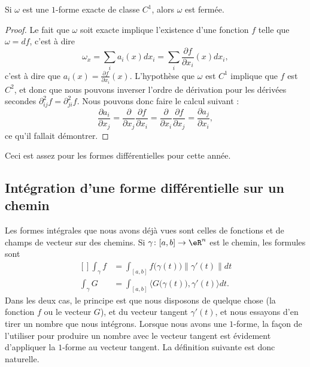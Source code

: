\begin{proposition}
	Si $\omega$ est une $1$-forme exacte de classe $C^1$, alors $\omega$ est fermée.
\end{proposition}

\begin{proof}
	Le fait que $\omega$ soit exacte implique l'existence d'une fonction $f$ telle que $\omega=df$, c'est à dire
	\begin{equation}
		\omega_x=\sum_i a_i(x)dx_i=\sum_i\frac{ \partial f }{ \partial x_i }(x)dx_i,
	\end{equation}
	c'est à dire que $a_i(x)=\frac{ \partial f }{ \partial x_i }(x)$. L'hypothèse que $\omega$ est $C^1$ implique que $f$ est $C^2$, et donc que nous pouvons inverser l'ordre de dérivation pour les dérivées secondes $\partial^2_{ij}f=\partial^2_{ji}f$. Nous pouvons donc faire le calcul suivant :
	\begin{equation}
		\frac{ \partial a_i }{ \partial x_j }=\frac{ \partial  }{ \partial x_j }\frac{ \partial f }{ \partial x_i }=\frac{ \partial  }{ \partial x_i }\frac{ \partial f }{ \partial x_j }=\frac{ \partial a_j }{ \partial x_i },
	\end{equation}
	ce qu'il fallait démontrer.
\end{proof}

Ceci est assez pour les formes différentielles pour cette année.

\subsection{Intégration d'une forme différentielle sur un chemin}

Les formes intégrales que nous avons déjà vues sont celles de fonctions et de champs de vecteur sur des chemins. Si $\gamma\colon [a,b]\to \eR^n$ est le chemin, les formules sont
\begin{equation}
	\begin{aligned}[]
		\int_{\gamma}f&=\int_{[a,b]}f\big( \gamma(t) \big)\| \gamma'(t) \|dt\\
		\int_{\gamma}G&=\int_{[a,b]}\langle G\big( \gamma(t) \big), \gamma'(t)\rangle dt.
	\end{aligned}
\end{equation}
Dans les deux cas, le principe est que nous disposons de quelque chose (la fonction $f$ ou le vecteur $G$), et du vecteur tangent $\gamma'(t)$, et nous essayons d'en tirer un nombre que nous intégrons. Lorsque nous avons une $1$-forme, la façon de l'utiliser pour produire un nombre avec le vecteur tangent est évidement d'appliquer la $1$-forme au vecteur tangent. La définition suivante est donc naturelle.

